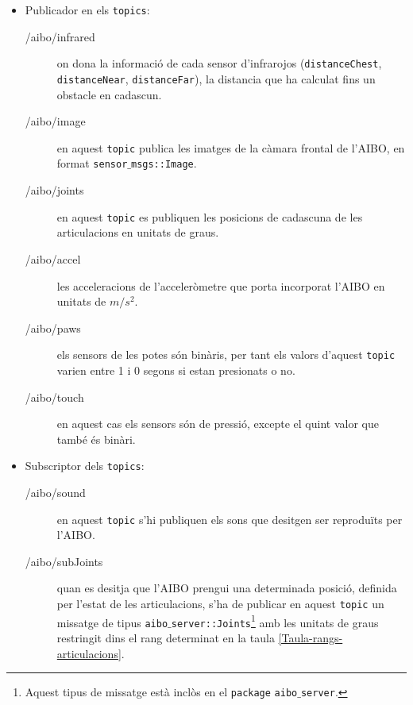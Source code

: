 \documentclass[12pt,a4paper,final,twoside]{report}
\begin{document}
\begin{itemize}

\item Publicador en els \texttt{topics}:
\begin{description}

\item[/aibo/infrared] on dona la informació de cada sensor d'infrarojos (\texttt{distanceChest}, \texttt{distanceNear}, \texttt{distanceFar}), la distancia que ha calculat fins un obstacle en cadascun.
\item[/aibo/image] en aquest \texttt{topic} publica les imatges de la càmara frontal de l'AIBO, en format \texttt{sensor$\_$msgs::Image}.
\item[/aibo/joints] en aquest \texttt{topic} es publiquen les posicions de cadascuna de les articulacions en unitats de graus.
\item[/aibo/accel] les acceleracions de l'acceleròmetre que porta incorporat l'AIBO en unitats de $m/s^2$.
\item[/aibo/paws] els sensors de les potes són binàris, per tant els valors d'aquest \texttt{topic} varien entre 1 i 0 segons si estan presionats o no.
\item[/aibo/touch] en aquest cas els sensors són de pressió, excepte el quint valor que també és binàri.


\end{description}

\item Subscriptor dels \texttt{topics}:

\begin{description}

\item[/aibo/sound] en aquest \texttt{topic} s'hi publiquen els sons que desitgen ser reproduïts per l'AIBO.
\item[/aibo/subJoints] quan es desitja que l'AIBO prengui una determinada posició, definida per l'estat de les articulacions, s'ha de publicar en aquest \texttt{topic} un missatge de tipus \texttt{aibo$\_$server::Joints}\footnote{Aquest tipus de missatge està inclòs en el \texttt{package} \texttt{aibo$\_$server}.} amb les unitats de graus restringit dins el rang determinat en la taula \ref{Taula-rangs-articulacions}.

\end{description}


\end{itemize}
\end{document}
